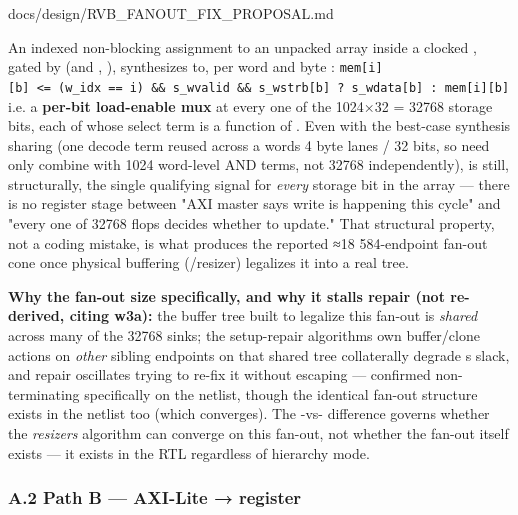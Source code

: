 \begin{relocated}{docs/design/RVB_FANOUT_FIX_PROPOSAL.md}
\begin{enumerate}
  An indexed non-blocking assignment to an unpacked array inside a
  clocked , gated by  (and ,
  ), synthesizes to, per word  and byte
  :
  \texttt{mem[i][b]\ <=\allowbreak{}\ (w\_\allowbreak{}idx\ =\allowbreak{}=\allowbreak{}\ i)\ \&\&\ s\_\allowbreak{}wvalid\ \&\&\ s\_\allowbreak{}wstrb[b]\ ?\ s\_\allowbreak{}wdata[b]\ :\allowbreak{}\ mem[i][b]}
  i.e. a \textbf{per-bit load-enable mux} at every one of the 1024×32 =
  32768 storage bits, each of whose select term is a function of
  . Even with the best-case synthesis sharing (one
   decode term reused across a word\textquotesingle s 4
  byte lanes / 32 bits, so  need only combine with 1024
  word-level AND terms, not 32768 independently),  is
  still, structurally, the single qualifying signal for \emph{every}
  storage bit in the array --- there is no register stage between "AXI
  master says write is happening this cycle" and "every one of 32768
  flops decides whether to update." That structural property, not a
  coding mistake, is what produces the reported ≈18 584-endpoint fan-out
  cone once physical buffering (/resizer) legalizes
  it into a real tree.
\end{enumerate}

\textbf{Why the fan-out size specifically, and why it stalls repair (not
re-derived, citing w3a):} the buffer tree built to legalize this fan-out
is \emph{shared} across many of the 32768 sinks; the setup-repair
algorithm\textquotesingle s own buffer/\allowbreak{}clone actions on
\emph{other} sibling endpoints on that shared tree collaterally degrade
\textquotesingle s slack, and repair oscillates
trying to re-fix it without escaping --- confirmed non-terminating
specifically on the  netlist, though the
identical fan-out structure exists in the  netlist too
(which converges). The -vs-
difference governs whether the \emph{resizer\textquotesingle s}
algorithm can converge on this fan-out, not whether the fan-out itself
exists --- it exists in the RTL regardless of hierarchy mode.

\subsubsection{\texorpdfstring{A.2 Path B ---  AXI-Lite
 → 
register}{A.2 Path B ---  AXI-Lite  →  register}}\label{tm:pd:rvb-fanout-fix:a2-path-b-u-gpu-axi-lite-s-axil-rdata-u-busu-periph-bridge-register}


\end{relocated}
